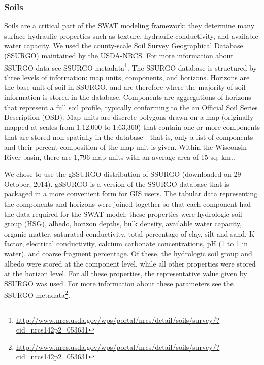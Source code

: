 \subsubsection{Soils}
Soils are a critical part of the SWAT modeling framework; they determine many surface hydraulic properties such as texture, hydraulic conductivity, and available water capacity. We used the county-scale Soil Survey Geographical Database (SSURGO) maintained by the USDA-NRCS. For more information about SSURGO data see SSURGO metadata\footnote{\url{http://www.nrcs.usda.gov/wps/portal/nrcs/detail/soils/survey/?cid=nrcs142p2_053631}}. The SSURGO database is structured by three levels of information: map units, components, and horizons. Horizons are the base unit of soil in SSURGO, and are therefore where the majority of soil information is stored in the database. Components are aggregations of horizons that represent a full soil profile, typically conforming to the an Official Soil Series Description (OSD). Map units are discrete polygons drawn on a map (originally mapped at scales from 1:12,000 to 1:63,360) that contain one or more components that are stored non-spatially in the database---that is, only a list of components and their percent composition of the map unit is given. Within the Wisconsin River basin, there are 1,796 map units with an average area of 15 sq. km.. 

We chose to use the gSSURGO distribution of SSURGO (downloaded on 29 October, 2014). gSSURGO is a version of the SSURGO database that is packaged in a more convenient form for GIS users. The tabular data representing the components and horizons were joined together so that each component had the data required for the SWAT model; these properties were hydrologic soil group (HSG), albedo, horizon depths, bulk density, available water capacity, organic matter, saturated conductivity, total percentage of clay, silt and sand, K factor, electrical conductivity, calcium carbonate concentrations, pH (1 to 1 in water), and coarse fragment percentage. Of these, the hydrologic soil group and albedo were stored at the component level, while all other properties were stored at the horizon level. For all these properties, the representative value given by SSURGO was used. For more information about these parameters see the SSURGO metadata\footnote{\url{http://www.nrcs.usda.gov/wps/portal/nrcs/detail/soils/survey/?cid=nrcs142p2_053631}}.

